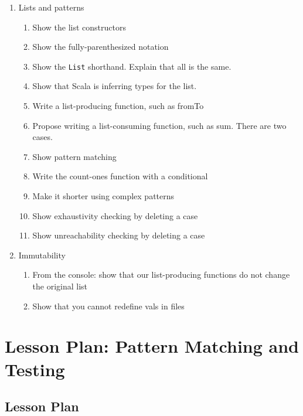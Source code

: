 \documentclass[9pt]{extbook}
\begin{document}
\begin{enumerate}
\item Lists and patterns

\begin{enumerate}

  \item Show the list constructors
  \item Show the fully-parenthesized notation
  \item Show the \lstinline|List| shorthand. Explain that all is the same.
  \item Show that Scala is inferring types for the list.
  \item Write a list-producing function, such as fromTo
  \item Propose writing a list-consuming function, such as sum. There are two cases.
  \item Show pattern matching
  \item Write the count-ones function with a conditional
  \item Make it shorter using complex patterns
  \item Show exhaustivity checking by deleting a case
  \item Show unreachability checking by deleting a case

\end{enumerate}

\item Immutability

\begin{enumerate}

  \item From the console: show that our list-producing functions do not
  change the original list

  \item Show that you cannot redefine vals in files

\end{enumerate}
\end{enumerate}

\chapter{Lesson Plan: Pattern Matching and Testing}

\lstset{language=scala}

\section*{Lesson Plan}
\end{document}
